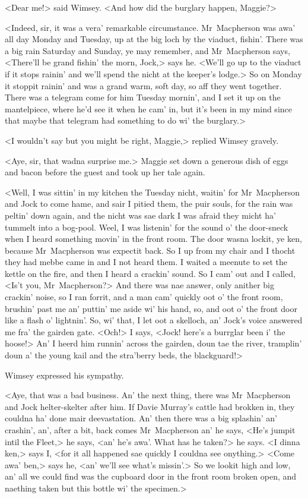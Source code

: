 <Dear me!> said Wimsey. <And how did the burglary happen, Maggie?>

<Indeed, sir, it was a vera' remarkable circumstance. Mr~Macpherson was awa' all day Monday and Tuesday, up at the big loch by the viaduct, fishin'. There was a big rain Saturday and Sunday, ye may remember, and Mr~Macpherson says, <There'll be grand fishin' the morn, Jock,> says he. <We'll go up to the viaduct if it stops rainin' and we'll spend the nicht at the keeper's lodge.> So on Monday it stoppit rainin' and was a grand warm, soft day, so aff they went together. There was a telegram come for him Tuesday mornin', and I set it up on the mantelpiece, where he'd see it when he cam' in, but it's been in my mind since that maybe that telegram had something to do wi' the burglary.>

<I wouldn't say but you might be right, Maggie,> replied Wimsey gravely.

<Aye, sir, that wadna surprise me.> Maggie set down a generous dish of eggs and bacon before the guest and took up her tale again.

<Well, I was sittin' in my kitchen the Tuesday nicht, waitin' for Mr~Macpherson and Jock to come hame, and sair I pitied them, the puir souls, for the rain was peltin' down again, and the nicht was sae dark I was afraid they micht ha' tummelt into a bog-pool. Weel, I was listenin' for the sound o' the door-sneck when I heard something movin' in the front room. The door wasna lockit, ye ken, because Mr~Macpherson was expectit back. So I up from my chair and I thocht they had mebbe came in and I not heard them. I waited a meenute to set the kettle on the fire, and then I heard a crackin' sound. So I cam' out and I called, <Is't you, Mr~Macpherson?> And there was nae answer, only anither big crackin' noise, so I ran forrit, and a man cam' quickly oot o' the front room, brushin' past me an' puttin' me aside wi' his hand, so, and oot o' the front door like a flash o' lightnin'. So, wi' that, I let oot a skelloch, an' Jock's voice answered me fra' the gairden gate. <Och!> I says, <Jock! here's a burrglar been i' the hoose!> An' I heerd him runnin' across the gairden, doun tae the river, tramplin' doun a' the young kail and the stra'berry beds, the blackguard!>

Wimsey expressed his sympathy.

<Aye, that was a bad business. An' the next thing, there was Mr~Macpherson and Jock helter-skelter after him. If Davie Murray's cattle had brokken in, they couldna ha' done mair deevastation. An' then there was a big splashin' an' crashin', an', after a bit, back comes Mr~Macpherson an' he says, <He's jumpit intil the Fleet,> he says, <an' he's awa'. What has he taken?> he says. <I dinna ken,> says I, <for it all happened sae quickly I couldna see onything.> <Come awa' ben,> says he, <an' we'll see what's missin'.> So we lookit high and low, an' all we could find was the cupboard door in the front room broken open, and naething taken but this bottle wi' the specimen.>

